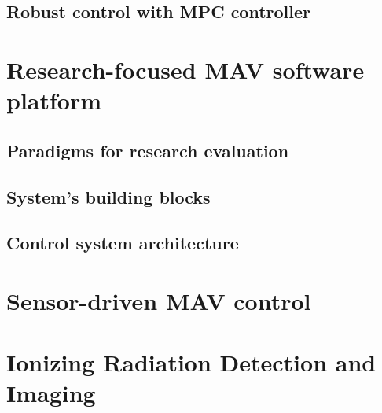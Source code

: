 \documentclass[a4paper,11pt,titlepage,twoside]{book}
\begin{document}
\section{Robust control with MPC controller}

\clearpage


\chapter{Research-focused MAV software platform}

\section{Paradigms for research evaluation}

\section{System's building blocks}

\section{Control system architecture}

\clearpage


\chapter{Sensor-driven MAV control}

\clearpage


\chapter{Ionizing Radiation Detection and Imaging}

\end{document}

